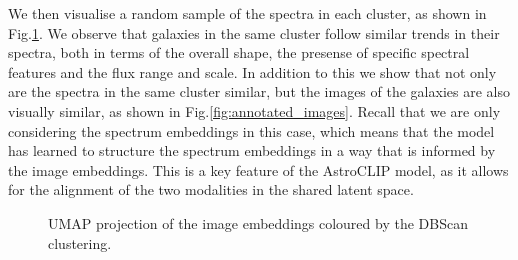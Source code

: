 \documentclass[a4paper,12pt]{article}
\begin{document}
We then visualise a random sample of the spectra in each cluster, as shown in Fig.\ref{fig:annotated_spectra}. We observe that galaxies in the same cluster follow similar trends in their spectra, both in terms of the overall shape, the presense of specific spectral features and the flux range and scale. In addition to this we show that not only are the spectra in the same cluster similar, but the images of the galaxies are also visually similar, as shown in Fig.\ref{fig:annotated_images}. Recall that we are only considering the spectrum embeddings in this case, which means that the model has learned to structure the spectrum embeddings in a way that is informed by the image embeddings. This is a key feature of the AstroCLIP model, as it allows for the alignment of the two modalities in the shared latent space.





\begin{figure}[H]
    \centering
    \caption{UMAP projection of the image embeddings coloured by the DBScan clustering.}
    \label{fig:annotated_spectra}
\end{figure}
\end{document}
